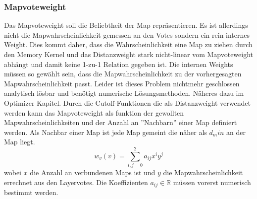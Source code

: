         \subsubsection{Mapvoteweight}
            Das Mapvoteweight soll die Beliebtheit der Map repräsentieren. 
            Es ist allerdings nicht die Mapwahrscheinlichkeit gemessen an den Votes sondern ein rein internes Weight.
            Dies kommt daher, dass die Wahrscheinlichkeit eine Map zu ziehen durch den Memory Kernel und das Distanzweight stark nicht-linear vom Mapvoteweight abhängt und damit keine 1-zu-1 Relation gegeben ist.
            Die internen Weights müssen so gewählt sein, dass die Mapwahrscheinlichkeit zu der vorhergesagten Mapwahrscheinlichkeit passt. 
            Leider ist dieses Problem nichtmehr geschlossen analytisch lösbar und benötigt numerische Lösungsmethoden. 
            Näheres dazu im Optimizer Kapitel.
            Durch die Cutoff-Funktionen die als Distanzweight verwendet werden kann das Mapvoteweight als funktion der gewollten Mapwahrscheinlichkeiten und der Anzahl an ''Nachbarn'' einer Map definiert werden. 
            Als Nachbar einer Map ist jede Map gemeint die näher als $d_min$ an der Map liegt. 
            \begin{equation}
                w_v(v) = \sum_{i,j = 0}^2 a_{ij}x^i y^j
            \end{equation}
            wobei $x$ die Anzahl an verbundenen Maps ist und $y$ die Mapwahrscheinlichkeit errechnet aus den Layervotes.
            Die Koeffizienten $a_{ij}\in\mathbb{R}$ müssen vorerst numerisch bestimmt werden. 
